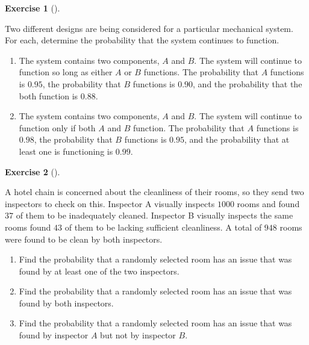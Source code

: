 \documentclass[
  letterpaper,
  DIV=11,
  numbers=noendperiod]{scrreprt}
\providecommand{\tightlist}{%
  \setlength{\itemsep}{0pt}\setlength{\parskip}{0pt}}\usepackage{longtable,booktabs,array}
\theoremstyle{definition}
\newtheorem{exercise}{Exercise}[chapter]
\theoremstyle{definition}
\theoremstyle{definition}
\theoremstyle{remark}
\begin{document}
\begin{exercise}[]\protect\hypertarget{exr-3.8}{}\label{exr-3.8}

Two different designs are being considered for a particular mechanical
system. For each, determine the probability that the system continues to
function.

\begin{enumerate}
\def\labelenumi{\alph{enumi}.}
\tightlist
\item
  The system contains two components, \(A\) and \(B\). The system will
  continue to function so long as either \(A\) or \(B\) functions. The
  probability that \(A\) functions is \(0.95\), the probability that
  \(B\) functions is \(0.90\), and the probability that the both
  function is \(0.88\).
\item
  The system contains two components, \(A\) and \(B\). The system will
  continue to function only if both \(A\) and \(B\) function. The
  probability that \(A\) functions is \(0.98\), the probability that
  \(B\) functions is \(0.95\), and the probability that at least one is
  functioning is \(0.99\).
\end{enumerate}

\end{exercise}

\begin{exercise}[]\protect\hypertarget{exr-3.9}{}\label{exr-3.9}

A hotel chain is concerned about the cleanliness of their rooms, so they
send two inspectors to check on this. Inspector A visually inspects
\(1000\) rooms and found \(37\) of them to be inadequately cleaned.
Inspector B visually inspects the same rooms found \(43\) of them to be
lacking sufficient cleanliness. A total of \(948\) rooms were found to
be clean by both inspectors.

\begin{enumerate}
\def\labelenumi{\alph{enumi}.}
\tightlist
\item
  Find the probability that a randomly selected room has an issue that
  was found by at least one of the two inspectors.
\item
  Find the probability that a randomly selected room has an issue that
  was found by both inspectors.
\item
  Find the probability that a randomly selected room has an issue that
  was found by inspector \(A\) but not by inspector \(B\).
\end{enumerate}

\end{exercise}
\end{document}

